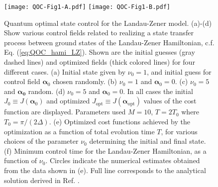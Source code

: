 \begin{figure}[t]
\texttt{[image: QOC-Fig1-A.pdf]}
\texttt{[image: QOC-Fig1-B.pdf]}
\caption{Quantum optimal state control for the Landau-Zener model. (a)-(d) Show various control fields related to realizing a state transfer process between ground states of the Landau-Zener Hamiltonian, c.f. Eq. (\ref{eq:QOC_hami_LZ}). Shown are the initial guesses (gray dashed lines) and optimized fields (thick colored lines) for four different cases. (a) Initial state given by $\nu_0=1$, and initial guess for control field $\bm{\alpha}_0$ chosen randomly. (b) $\nu_0=1$ and $\bm{\alpha}_0=0$. (c) $\nu_0=5$ and $\bm{\alpha_0}$ random. (d) $\nu_0=5$ and $\bm{\alpha}_0=0$. In all cases the initial $J_0\equiv J({\bm{\alpha}_0})$ and optimized $J_{\mathrm{opt}}\equiv J(\bm{\alpha}_{\mathrm{opt}})$ values of the cost function are displayed. Parameters used $M=10$, $T=2T_0$ where $T_0=\pi/(2\Delta)$. (e) Optimized cost functions achieved by the optimization as a function of total evolution time $T$, for various choices of the parameter $\nu_0$ determining the initial and final state. (f) Minimum control time for the Landau-Zener Hamiltonian, as a function of $\nu_0$. Circles indicate the numerical estimates obtained from the data shown in (e). Full line corresponds to the analytical solution derived in Ref. \cite{hegerfeldt2013}.}
\label{fig:QOC1}
\end{figure}

